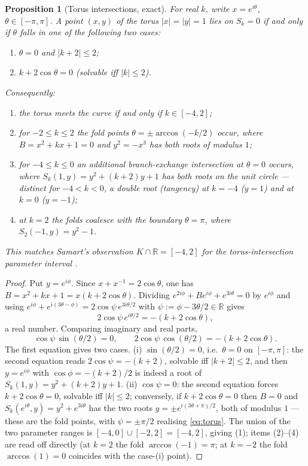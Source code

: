 \documentclass[preprint,12pt]{elsarticle}
\newtheorem{proposition}[theorem]{Proposition}
\theoremstyle{definition}
\theoremstyle{remark}
\newcommand{\R}{\mathbb{R}}
\begin{document}
\begin{proposition}[Torus intersections, exact]\label{prop:torus}
For \emph{real} $k$, write $x=e^{i\theta}$, $\theta\in[-\pi,\pi]$. A point
$(x,y)$ of the torus $|x|=|y|=1$ lies on $S_k=0$ if and only if $\theta$
falls in one of the following two cases:
\begin{enumerate}
  \item[\textup{(i)}] $\theta=0$ and $|k+2|\le2$;
  \item[\textup{(ii)}] $k+2\cos\theta=0$ \textup{(}solvable iff
  $|k|\le2$\textup{)}.
\end{enumerate}
Consequently:
\begin{enumerate}
  \item the torus meets the curve if and only if $k\in[-4,2]$;
  \item for $-2\le k\le2$ the \emph{fold points}
  $\theta=\pm\arccos(-k/2)$ occur, where $B=x^2+kx+1=0$ and $y^2=-x^3$ has
  both roots of modulus $1$;
  \item for $-4\le k\le0$ an additional \emph{branch-exchange intersection}
  at $\theta=0$ occurs, where $S_k(1,y)=y^2+(k+2)y+1$ has both roots on the
  unit circle --- distinct for $-4<k<0$, a double root (tangency) at $k=-4$
  ($y=1$) and at $k=0$ ($y=-1$);
  \item at $k=2$ the folds coalesce with the boundary $\theta=\pi$, where
  $S_2(-1,y)=y^2-1$.
\end{enumerate}
This matches Samart's observation $K\cap\R=[-4,2]$ for the
torus-intersection parameter interval \cite{Samart2023}.
\end{proposition}

\begin{proof}
Put $y=e^{i\phi}$. Since $x+x^{-1}=2\cos\theta$, one has
$B=x^2+kx+1=x(k+2\cos\theta)$. Dividing
$e^{2i\phi}+Be^{i\phi}+e^{3i\theta}=0$ by $e^{i\phi}$ and using
$e^{i\phi}+e^{i(3\theta-\phi)}=2\cos\psi\,e^{3i\theta/2}$ with
$\psi:=\phi-3\theta/2\in\R$ gives
\begin{equation}\label{eq:torus}
  2\cos\psi\,e^{i\theta/2}=-(k+2\cos\theta),
\end{equation}
a real number. Comparing imaginary and real parts,
\[
  \cos\psi\,\sin(\theta/2)=0,
  \qquad
  2\cos\psi\,\cos(\theta/2)=-(k+2\cos\theta).
\]
The first equation gives two cases. (i) $\sin(\theta/2)=0$, i.e.\
$\theta=0$ on $[-\pi,\pi]$: the second equation reads
$2\cos\psi=-(k+2)$, solvable iff $|k+2|\le2$, and then
$y=e^{i\phi}$ with $\cos\phi=-(k+2)/2$ is indeed a root of
$S_k(1,y)=y^2+(k+2)y+1$. (ii) $\cos\psi=0$: the second equation forces
$k+2\cos\theta=0$, solvable iff $|k|\le2$; conversely, if
$k+2\cos\theta=0$ then $B=0$ and $S_k(e^{i\theta},y)=y^2+e^{3i\theta}$
has the two roots $y=\pm e^{i(3\theta+\pi)/2}$, both of modulus $1$ ---
these are the fold points, with $\psi=\pm\pi/2$ realising
\eqref{eq:torus}. The union of the two parameter ranges is
$[-4,0]\cup[-2,2]=[-4,2]$, giving (1); items (2)--(4) are read off
directly (at $k=2$ the fold $\arccos(-1)=\pi$; at $k=-2$ the fold
$\arccos(1)=0$ coincides with the case-(i) point).
\end{proof}
\end{document}

